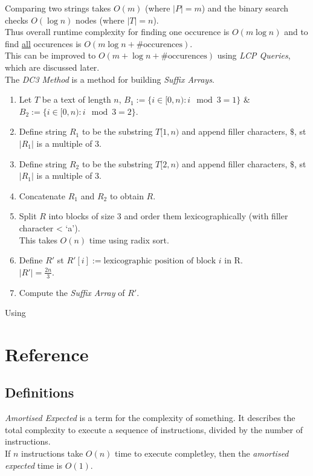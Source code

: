 \documentclass[11pt,a4paper]{article}
\begin{document}
Comparing two strings takes $O(m)$ (where $|P|=m$) and the binary search checks $O(\log n)$ nodes (where $|T|=n$).\\
Thus overall runtime complexity for finding one occurence is $O(m\log n)$ and to find \underline{all} occurences is $O(m\log n+\#\text{occurences})$.\\
\nb This can be improved to $O(m+\log n+\#\text{occurences})$ using \textit{LCP Queries}, which are discussed later.\\

The \textit{DC3 Method} is a method for building \textit{Suffix Arrays}.\\
\begin{enumerate}
	\item Let $T$ be a text of length $n$, $B_1:=\{i\in[0,n):i\mod 3=1\}$ \& $B_2:=\{i\in[0,n):i\mod 3=2\}$.
	\item Define string $R_1$ to be the substring $T[1,n)$ and append filler characters, $\$$, st $|R_1|$ is a multiple of 3.
	\item Define string $R_2$ to be the substring $T[2,n)$ and append filler characters, $\$$, st $|R_1|$ is a multiple of 3.
	\item Concatenate $R_1$ and $R_2$ to obtain $R$.
	\item Split $R$ into blocks of size 3 and order them lexicographically (with filler character < `a').\\
	\nb This takes $O(n)$ time using radix sort.
	\item Define $R'$ st $R'[i]:=\text{lexicographic position of block }i\text{ in R}$.\\
	\nb $|R'|=\frac{2n}3$.
	\item Compute the \textit{Suffix Array} of $R'$.	
\end{enumerate}
Using

\newpage
\setcounter{section}{-1}
\section{Reference}

\subsection{Definitions}

\textit{Amortised Expected} is a term for the complexity of something. It describes the total complexity to execute a sequence of instructions, divided by the number of instructions.\\
\eg If $n$ instructions take $O(n)$ time to execute completley, then the \textit{amortised expected} time is $O(1)$.
\end{document}
